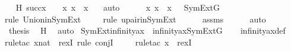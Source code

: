 \begin{isabellebody}
\ \isamarkupfalse%
\ H{\isacharcolon}{\kern0pt}\ {\isachardoublequoteopen}succ{\isacharparenleft}{\kern0pt}x{\isacharparenright}{\kern0pt}\ {\isacharequal}{\kern0pt}\ {\isasymUnion}\ {\isacharbraceleft}{\kern0pt}\ {\isacharbraceleft}{\kern0pt}x{\isacharcomma}{\kern0pt}\ x{\isacharbraceright}{\kern0pt}\ {\isacharcomma}{\kern0pt}\ x\ {\isacharbraceright}{\kern0pt}{\isachardoublequoteclose}\ \isamarkupfalse%
\ auto\isanewline
\isanewline
\ \ \isamarkupfalse%
\ {\isachardoublequoteopen}{\isasymUnion}\ {\isacharbraceleft}{\kern0pt}\ {\isacharbraceleft}{\kern0pt}x{\isacharcomma}{\kern0pt}\ x{\isacharbraceright}{\kern0pt}\ {\isacharcomma}{\kern0pt}\ x\ {\isacharbraceright}{\kern0pt}\ {\isasymin}\ SymExt{\isacharparenleft}{\kern0pt}G{\isacharparenright}{\kern0pt}{\isachardoublequoteclose}\ \isanewline
\ \ \ \ \isamarkupfalse%
{\isacharparenleft}{\kern0pt}rule\ Union{\isacharunderscore}{\kern0pt}in{\isacharunderscore}{\kern0pt}SymExt{\isacharparenright}{\kern0pt}\isanewline
\ \ \ \ \isamarkupfalse%
{\isacharparenleft}{\kern0pt}rule\ upair{\isacharunderscore}{\kern0pt}in{\isacharunderscore}{\kern0pt}SymExt{\isacharparenright}{\kern0pt}{\isacharplus}{\kern0pt}\isanewline
\ \ \ \ \isamarkupfalse%
\ assms\isanewline
\ \ \ \ \isamarkupfalse%
\ auto\isanewline
\ \ \isamarkupfalse%
\ \isamarkupfalse%
\ {\isacharquery}{\kern0pt}thesis\ \isamarkupfalse%
\ H\ \isamarkupfalse%
\ auto\isanewline
{}\isamarkupfalse%
%
\endisatagproof
{\isafoldproof}%
%
\isadelimproof
\isanewline
%
\endisadelimproof
\isanewline
{}\isamarkupfalse%
\ SymExt{\isacharunderscore}{\kern0pt}infinity{\isacharunderscore}{\kern0pt}ax\ {\isacharcolon}{\kern0pt}\ {\isachardoublequoteopen}infinity{\isacharunderscore}{\kern0pt}ax{\isacharparenleft}{\kern0pt}{\isacharhash}{\kern0pt}{\isacharhash}{\kern0pt}SymExt{\isacharparenleft}{\kern0pt}G{\isacharparenright}{\kern0pt}{\isacharparenright}{\kern0pt}{\isachardoublequoteclose}\isanewline
%
\isadelimproof
\ \ %
\endisadelimproof
%
\isatagproof
{}\isamarkupfalse%
\ infinity{\isacharunderscore}{\kern0pt}ax{\isacharunderscore}{\kern0pt}def\ \isanewline
\ \ \isamarkupfalse%
{\isacharparenleft}{\kern0pt}rule{\isacharunderscore}{\kern0pt}tac\ x{\isacharequal}{\kern0pt}nat\ \ rexI{\isacharcomma}{\kern0pt}\ rule\ conjI{\isacharparenright}{\kern0pt}\isanewline
\ \ \ \ \isamarkupfalse%
{\isacharparenleft}{\kern0pt}rule{\isacharunderscore}{\kern0pt}tac\ x{\isacharequal}{\kern0pt}{}\ \ rexI{\isacharparenright}{\kern0pt}\isanewline

\end{isabellebody}
